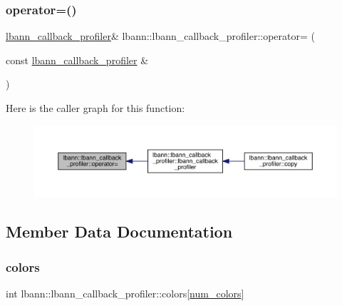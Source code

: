 \subsubsection{\texorpdfstring{operator=()}{operator=()}}
{\footnotesize\ttfamily \hyperlink{classlbann_1_1lbann__callback__profiler}{lbann\+\_\+callback\+\_\+profiler}\& lbann\+::lbann\+\_\+callback\+\_\+profiler\+::operator= (\begin{DoxyParamCaption}\item[{const \hyperlink{classlbann_1_1lbann__callback__profiler}{lbann\+\_\+callback\+\_\+profiler} \&}]{ }\end{DoxyParamCaption})\hspace{0.3cm}{\ttfamily [default]}}

Here is the caller graph for this function\+:\nopagebreak
\begin{figure}[H]
\begin{center}
\leavevmode
\includegraphics[width=350pt]{classlbann_1_1lbann__callback__profiler_ad9c93def349b324a9f3a20c73a5f29a0_icgraph}
\end{center}
\end{figure}


\subsection{Member Data Documentation}
\mbox{\label{classlbann_1_1lbann__callback__profiler_addf3323ce665956dc4988e3850bceb30}} 
\subsubsection{\texorpdfstring{colors}{colors}}
{\footnotesize\ttfamily int lbann\+::lbann\+\_\+callback\+\_\+profiler\+::colors\mbox{[}\hyperlink{classlbann_1_1lbann__callback__profiler_a48e38406712543f839dd7e5e840694e2}{num\+\_\+colors}\mbox{]}\hspace{0.3cm}{\ttfamily [private]}}

